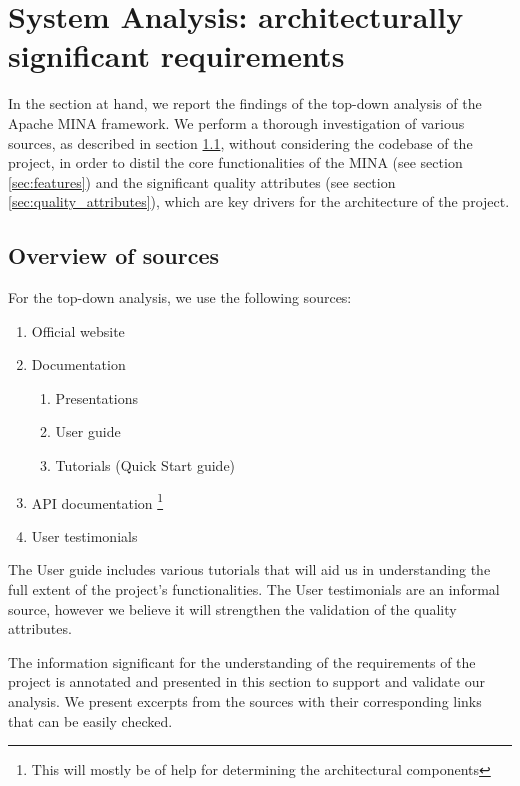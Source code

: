 \section{System Analysis: architecturally significant requirements}
\label{sec:analysis_requirements}
In the section at hand, we report the findings of the top-down analysis of the Apache MINA framework. We perform a thorough investigation of various sources, as described in section \ref{sec:overview_of_sources}, without considering the codebase of the project, in order to distil the core functionalities of the MINA (see section \ref{sec:features}) and the significant quality attributes (see section \ref{sec:quality_attributes}), which are key drivers for the architecture of the project.

\subsection{Overview of sources}
\label{sec:overview_of_sources}
For the top-down analysis, we use the following sources:
\begin{enumerate}
    \item Official website \cite{mina-website}
    \item Documentation \cite{mina-docs}
    \begin{enumerate}
        \item Presentations \cite{mina-talk2006, mina-talk2008}
        \item User guide \cite{mina-userguide}
        \item Tutorials (Quick Start guide) \cite{mina-qsguide}
    \end{enumerate}
    \item API documentation \cite{mina-reference} \footnote{This will mostly be of help for determining the architectural components}
    \item User testimonials \cite{mina-testimonials}
\end{enumerate}
The User guide includes various tutorials that will aid us in understanding the full extent of the project's functionalities. The User testimonials are an informal source, however we believe it will strengthen the validation of the quality attributes.

The information significant for the understanding of the requirements of the project is annotated and presented in this section to support and validate our analysis. We present excerpts from the sources with their corresponding links that can be easily checked.

